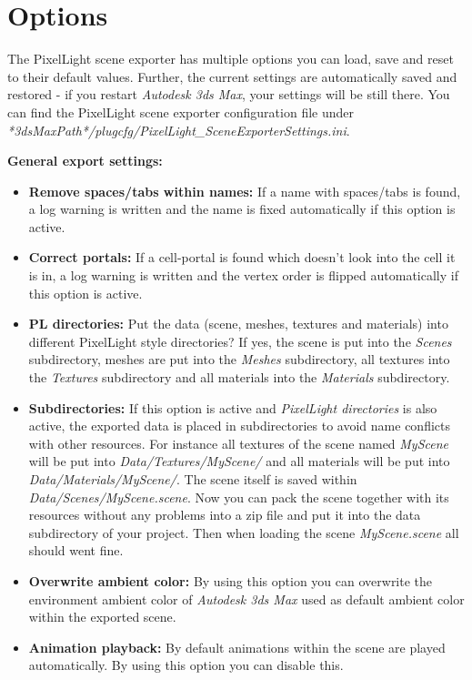 \chapter{Options}
The PixelLight scene exporter has multiple options you can load, save and reset to their default values. Further, the current settings are automatically saved and restored - if you restart \emph{Autodesk 3ds Max}, your settings will be still there. You can find the PixelLight scene exporter configuration file under \emph{*3dsMaxPath*/plugcfg/PixelLight\_SceneExporterSettings.ini}.

\textbf{General export settings:}
\begin{itemize}
\item{\textbf{Remove spaces/tabs within names:} If a name with spaces/tabs is found, a log warning is written and the name is fixed automatically if this option is active.}
\item{\textbf{Correct portals:} If a cell-portal is found which doesn't look into the cell it is in, a log warning is written and the vertex order is flipped automatically if this option is active.}
\item{\textbf{PL directories:} Put the data (scene, meshes, textures and materials) into different PixelLight style directories? If yes, the scene is put into the \emph{Scenes} subdirectory, meshes are put into the \emph{Meshes} subdirectory, all textures into the \emph{Textures} subdirectory and all materials into the \emph{Materials} subdirectory.}
\item{\textbf{Subdirectories:} If this option is active and \emph{PixelLight directories} is also active, the exported data is placed in subdirectories to avoid name conflicts with other resources. For instance all textures of the scene named \emph{MyScene} will be put into \emph{Data/Textures/MyScene/} and all materials will be put into \emph{Data/Materials/MyScene/}. The scene itself is saved within \emph{Data/Scenes/MyScene.scene}. Now you can pack the scene together with its resources without any problems into a zip file and put it into the data subdirectory of your project. Then when loading the scene \emph{MyScene.scene} all should went fine.}
\item{\textbf{Overwrite ambient color:} By using this option you can overwrite the environment ambient color of \emph{Autodesk 3ds Max} used as default ambient color within the exported scene.}
\item{\textbf{Animation playback:} By default animations within the scene are played automatically. By using this option you can disable this.}

\end{itemize}
